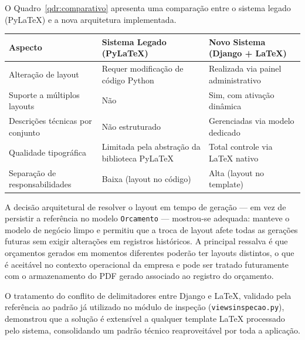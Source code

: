 O Quadro~\ref{qdr:comparativo} apresenta uma comparação entre o sistema legado (PyLaTeX) e a nova
arquitetura implementada.

\begin{quadro}[htb]
    \caption{\label{qdr:comparativo}Comparativo entre o sistema legado e o sistema desenvolvido}
    \begin{tabular}{|p{4.5cm}|p{4.5cm}|p{4.5cm}|}
        \hline
        \textbf{Aspecto} & \textbf{Sistema Legado (PyLaTeX)} & \textbf{Novo Sistema (Django + \LaTeX)} \\
        \hline
        Alteração de layout & Requer modificação de código Python & Realizada via painel administrativo \\
        \hline
        Suporte a múltiplos layouts & Não & Sim, com ativação dinâmica \\
        \hline
        Descrições técnicas por conjunto & Não estruturado & Gerenciadas via modelo dedicado \\
        \hline
        Qualidade tipográfica & Limitada pela abstração da biblioteca PyLaTeX & Total controle via \LaTeX{} nativo \\
        \hline
        Separação de responsabilidades & Baixa (layout no código) & Alta (layout no template) \\
        \hline
    \end{tabular}
\end{quadro}

A decisão arquitetural de resolver o layout em tempo de geração --- em vez de persistir a referência
no modelo \texttt{Orcamento} --- mostrou-se adequada: manteve o modelo de negócio limpo e permitiu
que a troca de layout afete todas as gerações futuras sem exigir alterações em registros históricos.
A principal ressalva é que orçamentos gerados em momentos diferentes poderão ter layouts distintos,
o que é aceitável no contexto operacional da empresa e pode ser tratado futuramente com o
armazenamento do PDF gerado associado ao registro do orçamento.

O tratamento do conflito de delimitadores entre Django e \LaTeX{}, validado pela referência ao padrão
já utilizado no módulo de inspeção (\texttt{viewsinspecao.py}), demonstrou que a solução é extensível
a qualquer template \LaTeX{} processado pelo sistema, consolidando um padrão técnico reaproveitável
por toda a aplicação.